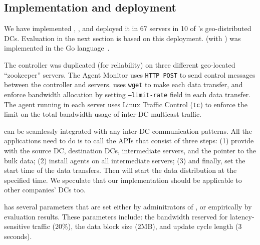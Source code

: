 \subsection{Implementation and deployment}
\label{sec:deployment}

We have implemented \name, , and deployed it in 67 servers in 10 of
\company's geo-distributed DCs. Evaluation in the next section is
based on this deployment. \name (with \newname) was implemented in the 
Go language~\cite{golang}.

The controller was duplicated (for reliability) on three different
geo-located ``zookeeper'' servers. The Agent Monitor uses \texttt{HTTP
POST} to send control messages between the controller and servers.
\name uses \texttt{wget} to make each data transfer, and enforce
bandwidth allocation by setting \texttt{--limit-rate} field in each
data transfer. The agent running in each server uses Linux Traffic
Control (\texttt{tc}) to enforce the limit on the total bandwidth
usage of inter-DC multicast traffic.

\name can be seamlessly integrated with any inter-DC communication
patterns. All the applications need to do is to call the \name APIs
that consist of three steps: (1) provide \name with the source DC,
destination DCs, intermediate servers, and the pointer to the bulk
data; (2) install agents on all intermediate servers; (3) and
finally, set the start time of the data transfers. Then \name will
start the data distribution at the specified time. We speculate that
our implementation should be applicable to other companies' DCs too.

\name has several parameters that are set either by adminitrators of
\company, or empirically by evaluation results. These parameters
include: the bandwidth reserved for latency-sensitive traffic (20\%),
the data block size (2MB), and update cycle length (3 seconds). 

